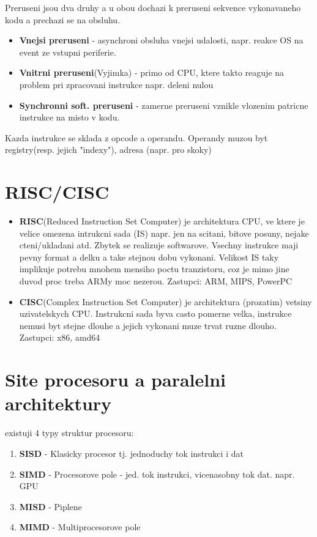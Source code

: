 \documentclass[10pt]{article}
\begin{document}
Preruseni jsou dva druhy a u obou dochazi k preruseni sekvence vykonavaneho kodu a prechazi se na obsluhu.
\begin{itemize}
\item \textbf{Vnejsi preruseni} - asynchroni obsluha vnejsi udalosti, napr. reakce OS na event ze vstupni periferie.
\item \textbf{Vnitrni preruseni}(Vyjimka) - primo od CPU, ktere takto reaguje na problem pri zpracovani instrukce napr. deleni nulou
\item \textbf{Synchronni soft. preruseni} - zamerne preruseni vznikle vlozenim patricne instrukce na misto v kodu.
\end{itemize}

Kazda instrukce se sklada z opcode a operandu. Operandy muzou byt registry(resp. jejich "indexy"), adresa (napr. pro skoky)

\section*{RISC/CISC}
\begin{itemize}
\item \textbf{RISC}(Reduced Instruction Set Computer) je architektura CPU, ve ktere je velice omezena intrukcni sada (IS) napr. jen na scitani, bitove posuny, nejake cteni/ukladani atd. Zbytek se realizuje softwarove. Vsechny instrukce maji pevny format a delku a take stejnou dobu vykonani. Velikost IS taky implikuje potrebu mnohem mensiho poctu tranzistoru, coz je mimo jine duvod proc treba ARMy moc nezerou. Zastupci: ARM, MIPS, PowerPC

\item \textbf{CISC}(Complex Instruction Set Computer) je architektura (prozatim) vetsiny uzivatelskych CPU. Instrukcni sada byva casto pomerne velka, instrukce nemusi byt stejne dlouhe a jejich vykonani muze trvat ruzne dlouho. Zastupci: x86, amd64
\end{itemize}

\section*{Site procesoru a paralelni architektury}
existuji 4 typy struktur procesoru:
\begin{enumerate}
\item \textbf{SISD} - Klasicky procesor tj. jednoduchy tok instrukci i dat
\item \textbf{SIMD} - Procesorove pole - jed. tok instrukci, vicenasobny tok dat. napr. GPU
\item \textbf{MISD} - Piplene
\item \textbf{MIMD} - Multiprocesorove pole
\end{enumerate}
\end{document}
